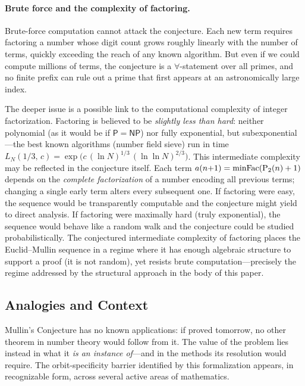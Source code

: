 \paragraph{Brute force and the complexity of factoring.}
Brute-force computation cannot attack the conjecture.  Each new term
requires factoring a number whose digit count grows roughly linearly
with the number of terms, quickly exceeding the reach of any known
algorithm.  But even if we could compute millions of terms, the
conjecture is a $\forall$-statement over all primes, and no finite
prefix can rule out a prime that first appears at an astronomically
large index.

The deeper issue is a possible link to the computational complexity of
integer factorization.  Factoring is believed to be \emph{slightly
less than hard}: neither polynomial (as it would be if $\mathsf{P} =
\mathsf{NP}$) nor fully exponential, but subexponential---the best
known algorithms (number field sieve) run in time
$L_N(1/3,\,c) = \exp\bigl(c\,(\ln N)^{1/3}\,(\ln\ln N)^{2/3}\bigr)$.
This intermediate complexity may be reflected in the conjecture
itself.  Each term $a(n{+}1) = \mathrm{minFac}(\mathrm{P}_{2}(n)+1)$ depends on the
\emph{complete factorization} of a number encoding all previous terms;
changing a single early term alters every subsequent one.  If factoring
were easy, the sequence would be transparently computable and the
conjecture might yield to direct analysis.  If factoring were
maximally hard (truly exponential), the sequence would behave like a
random walk and the conjecture could be studied probabilistically.
The conjectured intermediate complexity of factoring places the
Euclid--Mullin sequence in a regime where it has enough algebraic
structure to support a proof (it is not random), yet resists brute
computation---precisely the regime addressed by the structural approach
in the body of this paper.

\subsection{Analogies and Context}
\label{app:analogies}

Mullin's Conjecture has no known applications: if proved tomorrow, no
other theorem in number theory would follow from it.  The value of the
problem lies instead in what it \emph{is an instance of}---and in the
methods its resolution would require.  The orbit-specificity barrier
identified by this formalization appears, in recognizable form, across
several active areas of mathematics.

